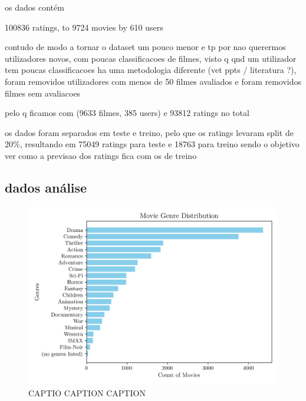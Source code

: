\documentclass[conference]{IEEEtran}
\begin{document}
os dados contém 

100836 ratings, to 9724 movies by 610 users

contudo de modo a tornar o dataset um pouco menor e tp por nao querermos utilizadores novos, com poucas classificacoes de filmes, visto q qnd um utilizador tem poucas classificacoes ha uma metodologia diferente (vet ppts / literatura ?), foram removidos utilizadores com menos de 50 filmes avaliados e foram removidos filmes sem avaliacoes

pelo q ficamos com (9633 filmes, 385 users) e 93812 ratings no total

os dados foram separados em teste e treino, pelo que os ratings levaram split de 20\%, resultando em 75049 ratings para teste e 18763 para treino sendo o objetivo ver como a previsao dos ratings fica com os de treino



\subsection{dados análise}

\begin{figure}[H]
    \centering
    \includegraphics[width=1\linewidth]{assets/genre_distribution.png}
    \caption{CAPTIO CAPTION CAPTION}
    \label{fig:genre_distribution}
\end{figure}
\end{document}
